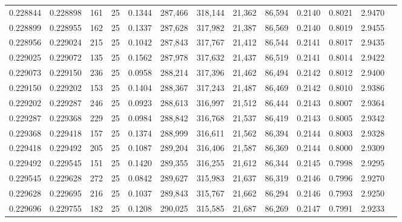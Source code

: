 \begin{tabular}{rrrrrrrrrrrrr}
0.228844 & 0.228898 &   161 &  25 &                                     0.1344 & 287,466 & 318,144 &  21,362 &  86,594 & 0.2140 & 0.8021 & 2.9470 \\
0.228899 & 0.228955 &   162 &  25 &                                     0.1337 & 287,628 & 317,982 &  21,387 &  86,569 & 0.2140 & 0.8019 & 2.9455 \\
0.228956 & 0.229024 &   215 &  25 &                                     0.1042 & 287,843 & 317,767 &  21,412 &  86,544 & 0.2141 & 0.8017 & 2.9435 \\
0.229025 & 0.229072 &   135 &  25 &                                     0.1562 & 287,978 & 317,632 &  21,437 &  86,519 & 0.2141 & 0.8014 & 2.9422 \\
0.229073 & 0.229150 &   236 &  25 &                                     0.0958 & 288,214 & 317,396 &  21,462 &  86,494 & 0.2142 & 0.8012 & 2.9400 \\
0.229150 & 0.229202 &   153 &  25 &                                     0.1404 & 288,367 & 317,243 &  21,487 &  86,469 & 0.2142 & 0.8010 & 2.9386 \\
0.229202 & 0.229287 &   246 &  25 &                                     0.0923 & 288,613 & 316,997 &  21,512 &  86,444 & 0.2143 & 0.8007 & 2.9364 \\
0.229287 & 0.229368 &   229 &  25 &                                     0.0984 & 288,842 & 316,768 &  21,537 &  86,419 & 0.2143 & 0.8005 & 2.9342 \\
0.229368 & 0.229418 &   157 &  25 &                                     0.1374 & 288,999 & 316,611 &  21,562 &  86,394 & 0.2144 & 0.8003 & 2.9328 \\
0.229418 & 0.229492 &   205 &  25 &                                     0.1087 & 289,204 & 316,406 &  21,587 &  86,369 & 0.2144 & 0.8000 & 2.9309 \\
0.229492 & 0.229545 &   151 &  25 &                                     0.1420 & 289,355 & 316,255 &  21,612 &  86,344 & 0.2145 & 0.7998 & 2.9295 \\
0.229545 & 0.229628 &   272 &  25 &                                     0.0842 & 289,627 & 315,983 &  21,637 &  86,319 & 0.2146 & 0.7996 & 2.9270 \\
0.229628 & 0.229695 &   216 &  25 &                                     0.1037 & 289,843 & 315,767 &  21,662 &  86,294 & 0.2146 & 0.7993 & 2.9250 \\
0.229696 & 0.229755 &   182 &  25 &                                     0.1208 & 290,025 & 315,585 &  21,687 &  86,269 & 0.2147 & 0.7991 & 2.9233 \\

\end{tabular}
